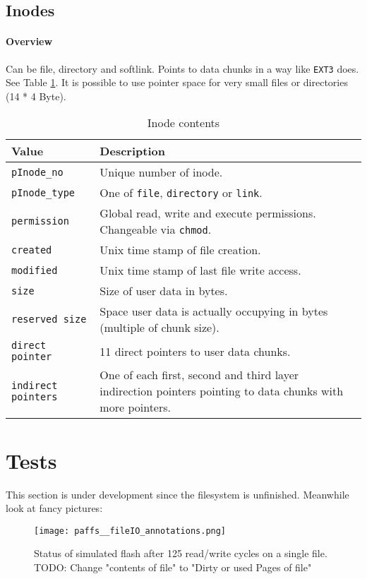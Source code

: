 \subsection{Inodes}
\label{inode}
\paragraph{Overview}
Can be file, directory and softlink. Points to data chunks in a way like \texttt{EXT3} does. See Table \ref{tab:pinode}. It is possible to use pointer space for very small files or directories (14 * 4 Byte).
\begin{table}[htbp]
\caption{Inode contents}
\label{tab:pinode}
\begin{tabularx}{\textwidth}{lp{11cm}p{2.5cm}}
\toprule
Value & Description\\
\midrule
\texttt{pInode\_no} & Unique number of inode. \\
\texttt{pInode\_type} & One of \texttt{file}, \texttt{directory} or \texttt{link}.\\
\texttt{permission} & Global read, write and execute permissions. Changeable via \texttt{chmod}.\\
\texttt{created} & Unix time stamp of file creation.\\
\texttt{modified} & Unix time stamp of last file write access.\\
\texttt{size} & Size of user data in bytes. \\
\texttt{reserved size} & Space user data is actually occupying in bytes (multiple of chunk size).\\
\texttt{direct pointer} & 11 direct pointers to user data chunks.\\
\texttt{indirect pointers} & One of each first, second and third layer indirection pointers pointing to data chunks with more pointers.\\
\bottomrule
\end{tabularx}
\end{table} 

\section{Tests}
\begin{flushleft}
	
\end{flushleft}
This section is under development since the filesystem is unfinished. Meanwhile look at fancy pictures:

\begin{figure}[htp]
	\centering\texttt{[image: paffs\_\_fileIO\_annotations.png]}
	\caption{\label{fig:fileIO} Status of simulated flash after 125 read/write cycles on a single file.\\TODO: Change "contents of file" to "Dirty or used Pages of file"}
\end{figure}


